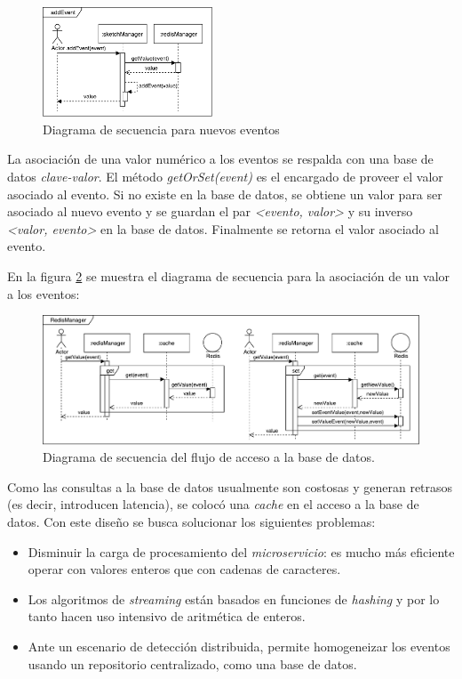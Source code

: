 \documentclass[a4paper,10pt, oneside]{article}
\begin{document}
\begin{figure}[htbp]
	\centering
	\includegraphics[width=0.45\textwidth]{graph/SecDiag-resourceAddEvent.pdf}
	\caption{Diagrama de secuencia para nuevos eventos}
	\label{fig:SecDiagResourceAddEvent}
\end{figure}

La asociación de una valor numérico a los eventos se respalda con una base de datos \textit{clave-valor}. El método \textit{getOrSet(event)} es el encargado de proveer el valor asociado al evento. Si no existe en la base de datos, se obtiene un valor para ser asociado al nuevo evento y se guardan el par \textit{<evento, valor>} y su inverso \textit{<valor, evento>} en la base de datos. Finalmente se retorna el valor asociado al evento.

En la figura \ref{fig:RedisManagerGetValue} se muestra el diagrama de secuencia para la asociación de un valor a los eventos:

\begin{figure}[htbp]
	\centering
	\includegraphics[width=1\textwidth]{graph/SecDiag-redisManagerGetValue.pdf}
	\caption{Diagrama de secuencia del flujo de acceso a la base de datos.}
	\label{fig:RedisManagerGetValue}
	
\end{figure}

Como las consultas a la base de datos usualmente son costosas y generan retrasos (es decir, introducen latencia), se colocó una \textit{cache} en el acceso a la base de datos. Con este diseño se busca solucionar los siguientes problemas:
\begin{itemize}
	\item Disminuir la carga de procesamiento del \textit{microservicio}: es mucho más eficiente operar con valores enteros que con cadenas de caracteres.
	\item Los algoritmos de \textit{streaming} están basados en funciones de \textit{hashing} y por lo tanto hacen uso intensivo de aritmética de enteros.
	\item Ante un escenario de detección distribuida, permite homogeneizar los eventos usando un repositorio centralizado, como una base de datos.
\end{itemize}
\end{document}
